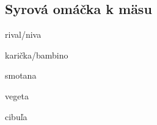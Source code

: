 \setcounter{step}{0}
\subsection{Syrová omáčka k mäsu}

\begin{ingredient}
\begin{main}
	\item rival/niva
	\item karička/bambino
	\item smotana
	\item vegeta
	\item cibuľa
\end{main}
\end{ingredient}%
\begin{recipe}


\end{recipe}

\begin{notes}

\end{notes}	